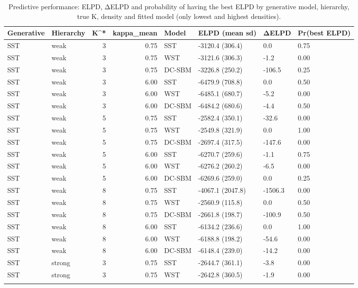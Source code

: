 \begin{table}
\centering
\caption{Predictive performance: ELPD, ΔELPD and probability of having the best ELPD by generative model, hierarchy, true K, density and fitted model (only lowest and highest densities).}
\centering
\begin{tabular}[t]{llrrllll}
\toprule
Generative & Hierarchy & K^* & kappa_mean & Model & ELPD (mean sd) & ΔELPD & Pr(best ELPD)\\
\midrule
SST & weak & 3 & 0.75 & SST & -3120.4 (306.4) & 0.0 & 0.75\\
SST & weak & 3 & 0.75 & WST & -3121.6 (306.3) & -1.2 & 0.00\\
SST & weak & 3 & 0.75 & DC-SBM & -3226.8 (250.2) & -106.5 & 0.25\\
SST & weak & 3 & 6.00 & SST & -6479.9 (708.8) & 0.0 & 0.50\\
SST & weak & 3 & 6.00 & WST & -6485.1 (680.7) & -5.2 & 0.00\\
\addlinespace
SST & weak & 3 & 6.00 & DC-SBM & -6484.2 (680.6) & -4.4 & 0.50\\
SST & weak & 5 & 0.75 & SST & -2582.4 (350.1) & -32.6 & 0.00\\
SST & weak & 5 & 0.75 & WST & -2549.8 (321.9) & 0.0 & 1.00\\
SST & weak & 5 & 0.75 & DC-SBM & -2697.4 (317.5) & -147.6 & 0.00\\
SST & weak & 5 & 6.00 & SST & -6270.7 (259.6) & -1.1 & 0.75\\
\addlinespace
SST & weak & 5 & 6.00 & WST & -6276.2 (260.2) & -6.5 & 0.00\\
SST & weak & 5 & 6.00 & DC-SBM & -6269.6 (259.0) & 0.0 & 0.25\\
SST & weak & 8 & 0.75 & SST & -4067.1 (2047.8) & -1506.3 & 0.00\\
SST & weak & 8 & 0.75 & WST & -2560.9 (115.8) & 0.0 & 0.50\\
SST & weak & 8 & 0.75 & DC-SBM & -2661.8 (198.7) & -100.9 & 0.50\\
\addlinespace
SST & weak & 8 & 6.00 & SST & -6134.2 (236.6) & 0.0 & 1.00\\
SST & weak & 8 & 6.00 & WST & -6188.8 (198.2) & -54.6 & 0.00\\
SST & weak & 8 & 6.00 & DC-SBM & -6148.4 (239.0) & -14.2 & 0.00\\
SST & strong & 3 & 0.75 & SST & -2644.7 (361.1) & -3.8 & 0.00\\
SST & strong & 3 & 0.75 & WST & -2642.8 (360.5) & -1.9 & 0.00\\
\addlinespace

\end{tabular}
\end{table}
